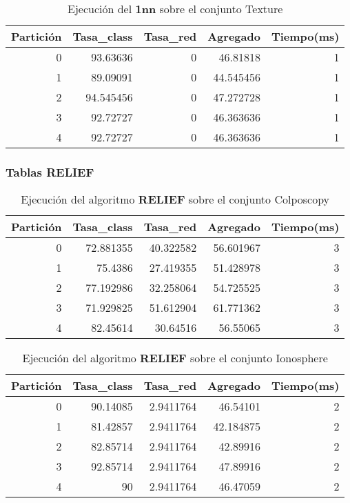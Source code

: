 \documentclass[size=a4, parskip=half, titlepage=false, toc=flat, toc=bib, 12pt]{scrartcl}
\begin{document}
 \begin{table}[ht]
  \centering
  \begin{tabular}[t]{rrrrr}
  \toprule
  Partición &Tasa\_class &Tasa\_red & Agregado & Tiempo(ms)\\
  \midrule
0         & 93.63636  & 0        & 46.81818  & 1      \\
1         & 89.09091  & 0        & 44.545456 & 1      \\
2         & 94.545456 & 0        & 47.272728 & 1      \\
3         & 92.72727  & 0        & 46.363636 & 1      \\
4         & 92.72727  & 0        & 46.363636 & 1      \\
  \bottomrule
  \end{tabular}
  \caption{Ejecución del \textbf{1nn} sobre el conjunto Texture}
  \end{table}%

\newpage
\subsubsection{Tablas RELIEF}

 \begin{table}[ht]
  \centering
  \begin{tabular}[t]{rrrrr}
  \toprule
  Partición &Tasa\_class &Tasa\_red & Agregado & Tiempo(ms)\\
  \midrule
0         & 72.881355 & 40.322582 & 56.601967 & 3      \\
1         & 75.4386   & 27.419355 & 51.428978 & 3      \\
2         & 77.192986 & 32.258064 & 54.725525 & 3      \\
3         & 71.929825 & 51.612904 & 61.771362 & 3      \\
4         & 82.45614  & 30.64516  & 56.55065  & 3      \\
  \bottomrule
  \end{tabular}
  \caption{Ejecución del algoritmo \textbf{RELIEF} sobre el conjunto Colposcopy }
  \end{table}%

 \begin{table}[ht]
  \centering
  \begin{tabular}[t]{rrrrr}
  \toprule
  Partición &Tasa\_class &Tasa\_red & Agregado & Tiempo(ms)\\
  \midrule
0         & 90.14085  & 2.9411764 & 46.54101  & 2      \\
1         & 81.42857  & 2.9411764 & 42.184875 & 2      \\
2         & 82.85714  & 2.9411764 & 42.89916  & 2      \\
3         & 92.85714  & 2.9411764 & 47.89916  & 2      \\
4         & 90        & 2.9411764 & 46.47059  & 2      \\
  \bottomrule
  \end{tabular}
  \caption{Ejecución del algoritmo \textbf{RELIEF} sobre el conjunto Ionosphere}
  \end{table}%
\end{document}
